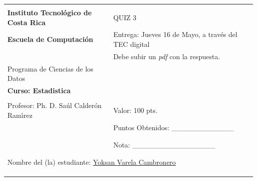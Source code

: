 \documentclass[spanish,english]{article}
\providecommand{\tabularnewline}{\\}
\begin{document}
\begin{flushleft}
\begin{tabular}{|l|l|}
\hline 
 & \tabularnewline
\textbf{\large{}Instituto Tecnol\'{o}gico de Costa Rica} & QUIZ 3\tabularnewline
\textbf{\large{}Escuela de Computaci\'{o}n} & Entrega: Jueves 16 de Mayo, a trav\'{e}s del TEC digital\tabularnewline
 & Debe subir un \emph{pdf }con la respuesta.\tabularnewline
Programa de Ciencias de los Datos & \tabularnewline
\textbf{Curso: Estadistica} & \tabularnewline
 & \tabularnewline
Profesor: Ph. D. Sa\'{u}l Calder\'{o}n Ram\'{\i}rez & Valor: 100 pts.\tabularnewline
 & Puntos Obtenidos: \_\_\_\_\_\_\_\_\_\_\_\_\tabularnewline
 & \tabularnewline
 & \tabularnewline
 & Nota: \_\_\_\_\_\_\_\_\_\_\_\_\_\_\_\_\tabularnewline
 & \tabularnewline
\cline{2-2} 
\multicolumn{2}{|c|}{}\tabularnewline
\multicolumn{2}{|l|}{Nombre del (la) estudiante: \underline{Yoksan Varela Cambronero}}\tabularnewline
\multicolumn{1}{|l}{} & \tabularnewline
\multicolumn{1}{|l}{} & \tabularnewline
\multicolumn{1}{|l}{} & \tabularnewline
\hline 
\end{tabular}
\par\end{flushleft}
\end{document}
